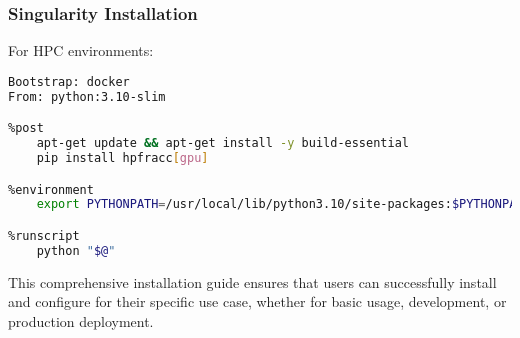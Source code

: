 \subsubsection{Singularity Installation}

For HPC environments:

\begin{lstlisting}[language=bash, caption=Singularity Recipe]
Bootstrap: docker
From: python:3.10-slim

%post
    apt-get update && apt-get install -y build-essential
    pip install hpfracc[gpu]

%environment
    export PYTHONPATH=/usr/local/lib/python3.10/site-packages:$PYTHONPATH

%runscript
    python "$@"
\end{lstlisting}

This comprehensive installation guide ensures that users can successfully install and configure \hpfracc for their specific use case, whether for basic usage, development, or production deployment.
